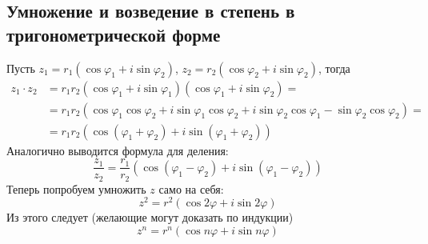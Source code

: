 \documentclass[12pt, a4paper]{article}
\begin{document}
    \subsection{Умножение и возведение в степень в тригонометрической форме}
    Пусть \( z_{1} = r_{1}(\cos \varphi_{1} + i \sin \varphi_{2}) \), \( z_{2} = r_{2}(\cos \varphi_{2} + i \sin \varphi_{2}) \), тогда
    \begin{align*}
        z_{1}\cdot z_{2} &= r_{1}r_{2}(\cos \varphi_{1} + i \sin \varphi_{1}) (\cos \varphi_{1} + i \sin \varphi_{2}) = \\
                         &=r_{1}r_{2}(\cos \varphi_{1}\cos \varphi_{2} + i \sin\varphi_{1}\cos \varphi_{2} + i \sin \varphi_{2}\cos \varphi_{1} - \sin \varphi_{2}\cos \varphi_{2}) = \\
                         & = r_{1}r_{2}(\cos (\varphi_{1} + \varphi_{2}) + i \sin(\varphi_{1} + \varphi_{2}))
    \end{align*}
    Аналогично выводится формула для деления: \[
        \frac{z_{1}}{z_{2}} = \frac{r_{1}}{r_{2}}(\cos (\varphi_{1} - \varphi_{2}) + i \sin (\varphi_{1} - \varphi_{2}))
    \] 
    Теперь попробуем умножить \( z \) само на себя:
    \[
        z^2 = r^2(\cos  2\varphi + i \sin 2\varphi)
    \] 
    Из этого следует (желающие могут доказать по индукции) \[
        z^{n} = r^{n}(\cos n\varphi + i \sin n\varphi)  
    \] 
\end{document}
